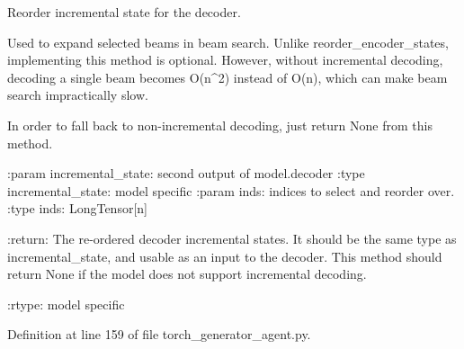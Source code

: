 \begin{DoxyVerb}Reorder incremental state for the decoder.

Used to expand selected beams in beam search. Unlike reorder_encoder_states,
implementing this method is optional. However, without incremental decoding,
decoding a single beam becomes O(n^2) instead of O(n), which can make
beam search impractically slow.

In order to fall back to non-incremental decoding, just return None from this
method.

:param incremental_state:
    second output of model.decoder
:type incremental_state:
    model specific
:param inds:
    indices to select and reorder over.
:type inds:
    LongTensor[n]

:return:
    The re-ordered decoder incremental states. It should be the same
    type as incremental_state, and usable as an input to the decoder.
    This method should return None if the model does not support
    incremental decoding.

:rtype:
    model specific
\end{DoxyVerb}
 

Definition at line 159 of file torch\+\_\+generator\+\_\+agent.\+py.


